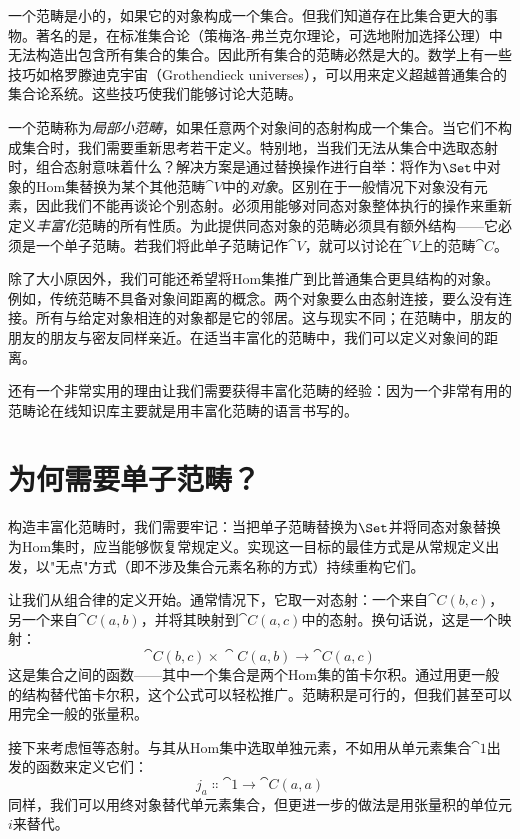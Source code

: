 
\lettrine[lhang=0.17]{一}{个范畴是小}的，如果它的对象构成一个集合。但我们知道存在比集合更大的事物。著名的是，在标准集合论（策梅洛-弗兰克尔理论，可选地附加选择公理）中无法构造出包含所有集合的集合。因此所有集合的范畴必然是大的。数学上有一些技巧如格罗滕迪克宇宙（Grothendieck universes），可以用来定义超越普通集合的集合论系统。这些技巧使我们能够讨论大范畴。

一个范畴称为\emph{局部小范畴}，如果任意两个对象间的态射构成一个集合。当它们不构成集合时，我们需要重新思考若干定义。特别地，当我们无法从集合中选取态射时，组合态射意味着什么？解决方案是通过替换操作进行自举：将作为$\Set$中对象的Hom集替换为某个其他范畴$\cat{V}$中的\emph{对象}。区别在于一般情况下对象没有元素，因此我们不能再谈论个别态射。必须用能够对同态对象整体执行的操作来重新定义\emph{丰富化}范畴的所有性质。为此提供同态对象的范畴必须具有额外结构——它必须是一个单子范畴。若我们将此单子范畴记作$\cat{V}$，就可以讨论在$\cat{V}$上的范畴$\cat{C}$。

除了大小原因外，我们可能还希望将Hom集推广到比普通集合更具结构的对象。例如，传统范畴不具备对象间距离的概念。两个对象要么由态射连接，要么没有连接。所有与给定对象相连的对象都是它的邻居。这与现实不同；在范畴中，朋友的朋友的朋友与密友同样亲近。在适当丰富化的范畴中，我们可以定义对象间的距离。

还有一个非常实用的理由让我们需要获得丰富化范畴的经验：因为一个非常有用的范畴论在线知识库主要就是用丰富化范畴的语言书写的。

\section{为何需要单子范畴？}

构造丰富化范畴时，我们需要牢记：当把单子范畴替换为$\Set$并将同态对象替换为Hom集时，应当能够恢复常规定义。实现这一目标的最佳方式是从常规定义出发，以"无点"方式（即不涉及集合元素名称的方式）持续重构它们。

让我们从组合律的定义开始。通常情况下，它取一对态射：一个来自$\cat{C}(b, c)$，另一个来自$\cat{C}(a, b)$，并将其映射到$\cat{C}(a, c)$中的态射。换句话说，这是一个映射：
$$\cat{C}(b, c)\times{}\cat{C}(a, b) \to \cat{C}(a, c)$$
这是集合之间的函数——其中一个集合是两个Hom集的笛卡尔积。通过用更一般的结构替代笛卡尔积，这个公式可以轻松推广。范畴积是可行的，但我们甚至可以用完全一般的张量积。

接下来考虑恒等态射。与其从Hom集中选取单独元素，不如用从单元素集合$\cat{1}$出发的函数来定义它们：
$$j_a \Colon \cat{1} \to \cat{C}(a, a)$$
同样，我们可以用终对象替代单元素集合，但更进一步的做法是用张量积的单位元$i$来替代。

